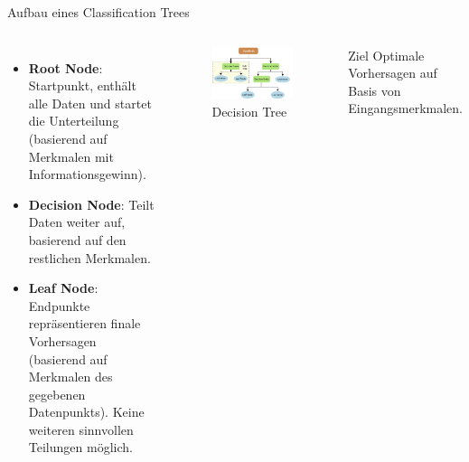 \documentclass{beamer}
\begin{document}
\begin{frame}{Aufbau eines Classification Trees}

	\begin{columns}
			\begin{itemize}
				\item {\textbf{Root Node}: Startpunkt, enthält alle Daten und startet die Unterteilung (basierend auf Merkmalen mit Informationsgewinn).}
				\item {\textbf{Decision Node}: Teilt Daten weiter auf, basierend auf den restlichen Merkmalen.}
				\item {\textbf{Leaf Node}: Endpunkte repräsentieren finale Vorhersagen (basierend auf Merkmalen des gegebenen Datenpunkts). Keine weiteren sinnvollen Teilungen möglich.}
			\end{itemize}	
			
			\begin{figure}
			
				\includegraphics[width=\linewidth]{Images/tree.png}
				\caption{Decision Tree \cite{Charbuty2021ClassificationBO}}
			\end{figure}
			
			\pause
			\begin{alertblock}{Ziel}
				Optimale Vorhersagen auf Basis von Eingangsmerkmalen.			
			\end{alertblock}
	\end{columns}

\end{frame}
\end{document}

